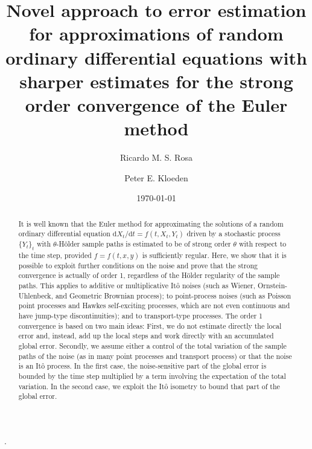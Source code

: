 \documentclass[reqno,12pt]{amsart}
\theoremstyle{plain}%
\theoremstyle{definition}
\begin{document}


\title[Strong order convergence of Euler for Random ODEs]{Novel approach to error estimation for approximations of random ordinary differential equations with sharper estimates for the strong order convergence of the Euler method}

\author[R. M. S. Rosa]{Ricardo M. S. Rosa}

\author[P. E. Kloeden]{Peter E. Kloeden}

\address[Ricardo M. S. Rosa]{Instituto de Matem\'atica, Universidade Federal do Rio de Janeiro, Brazil}
\address[Peter E. Kloeden]{Mathematics Department, University of Tubingen, Germany}


\date{\today}


.

\begin{abstract}
It is well known that the Euler method for approximating the solutions of a random ordinary differential equation $\mathrm{d}X_t/\mathrm{d}t = f(t, X_t, Y_t)$ driven by a stochastic process $\{Y_t\}_t$ with $\theta$-H\"older sample paths is estimated to be of strong order $\theta$ with respect to the time step, provided $f=f(t, x, y)$ is sufficiently regular. Here, we show that it is possible to exploit further conditions on the noise and prove that the strong convergence is actually of order 1, regardless of the H\"older regularity of the sample paths. This applies to additive or multiplicative It\^o noises (such as Wiener, Ornstein-Uhlenbeck, and Geometric Brownian process); to point-process noises (such as Poisson point processes and Hawkes self-exciting processes, which are not even continuous and have jump-type discontinuities); and to transport-type processes. The order 1 convergence is based on two main ideas: First, we do not estimate directly the local error and, instead, add up the local steps and work directly with an accumulated global error. Secondly, we assume either a control of the total variation of the sample paths of the noise (as in many point processes and transport process) or that the noise is an It\^o process. In the first case, the noise-sensitive part of the global error is bounded by the time step multiplied by a term involving the expectation of the total variation. In the second case, we exploit the It\^o isometry to bound that part of the global error.
\end{abstract}
\end{document}
